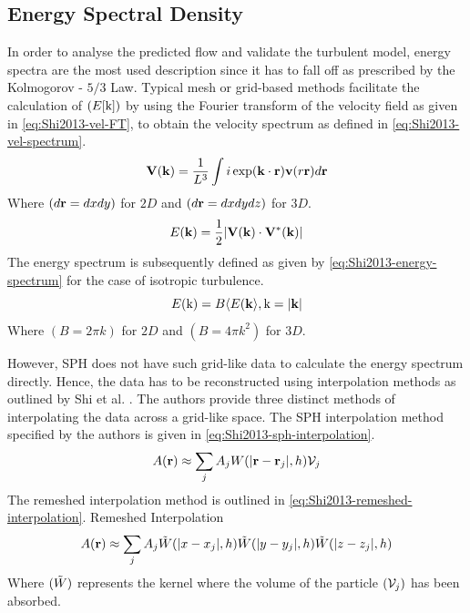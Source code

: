 \subsection{Energy Spectral Density}
In order to analyse the predicted flow and validate the turbulent model, energy spectra are the most used description since it has to fall off as prescribed by the  Kolmogorov - $5/3$ Law.
Typical mesh or grid-based methods facilitate the calculation of $(E[\mathrm{k}])$ by using the Fourier transform of the velocity field as given in \ref{eq:Shi2013-vel-FT}, to obtain the velocity spectrum as defined in \ref{eq:Shi2013-vel-spectrum}.
\begin{equation}
    \mathbf{V}(\mathbf{k}) = \frac{1}{L^3} \int i \exp(\mathbf{k} \cdot \mathbf{r}) \mathbf{v}(r\mathbf{r}) d\mathbf{r}
    \label{eq:Shi2013-vel-FT}
\end{equation}
Where $(d\mathbf{r}=dxdy)$ for $2D$ and $(d\mathbf{r}=dxdydz)$ for $3D$.
\begin{equation}
    E(\mathbf{k}) = \frac{1}{2} |\mathbf{V}(\mathbf{k}) \cdot \mathbf{V}^*(\mathbf{k}) |
    \label{eq:Shi2013-vel-spectrum}
\end{equation}
The energy spectrum is subsequently defined as given by \ref{eq:Shi2013-energy-spectrum} for the case of isotropic turbulence.
\begin{equation}
    E(\mathrm{k}) = B \langle E(\mathbf{k} \rangle, \mathrm{k} = |\mathbf{k}|
    \label{eq:Shi2013-energy-spectrum}
\end{equation}
Where $(B=2\pi k)$ for $2D$ and $(B=4\pi k^2)$ for $3D$.

However, SPH does not have such grid-like data to calculate the energy spectrum directly. Hence, the data has to be reconstructed using interpolation methods as outlined by Shi et al. \parencite{Shi2013}.
The authors provide three distinct methods of interpolating the data across a grid-like space. 
The SPH interpolation method specified by the authors is given in \ref{eq:Shi2013-sph-interpolation}.
\begin{equation}
    A(\mathbf{r}) \approx \sum_j A_j W(|\mathbf{r} - \mathbf{r}_j|, h) \mathcal{V}_j
    \label{eq:Shi2013-sph-interpolation}
\end{equation}
The remeshed interpolation method is outlined in \ref{eq:Shi2013-remeshed-interpolation}.
Remeshed Interpolation
\begin{equation}
    A(\mathbf{r}) \approx \sum_j A_j \Tilde{W}(|x-x_j|, h) \Tilde{W}(|y-y_j|, h) \Tilde{W}(|z-z_j|, h)
    \label{eq:Shi2013-remeshed-interpolation}
\end{equation}
Where $(\Tilde{W})$ represents the kernel where the volume of the particle $(\mathcal{V}_j)$ has been absorbed.

